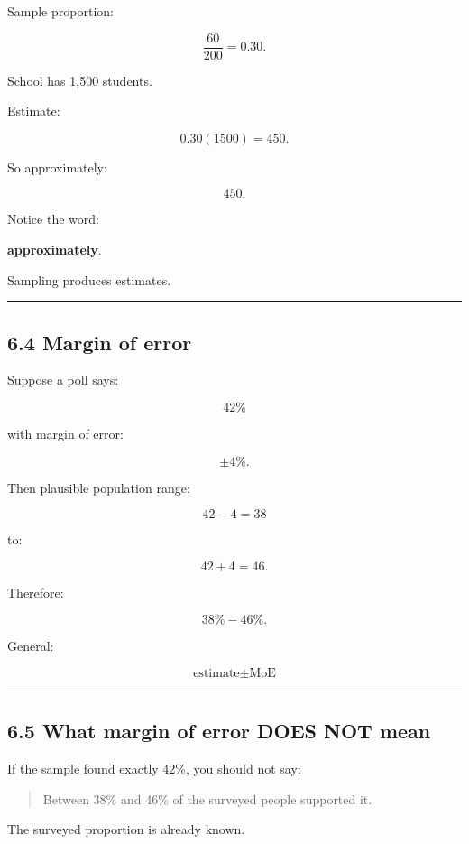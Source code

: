 \documentclass[
]{article}
\begin{document}
Sample proportion:

\[
\frac{60}{200}=0.30.
\]

School has 1,500 students.

Estimate:

\[
0.30(1500)=450.
\]

So approximately:

\[
\boxed{450}.
\]

Notice the word:

\textbf{approximately}.

Sampling produces estimates.

\begin{center}\rule{0.5\linewidth}{0.5pt}\end{center}

\subsection{6.4 Margin of error}\label{margin-of-error}

Suppose a poll says:

\[
42\%
\]

with margin of error:

\[
\pm4\%.
\]

Then plausible population range:

\[
42-4=38
\]

to:

\[
42+4=46.
\]

Therefore:

\[
\boxed{38\%-46\%}.
\]

General:

\[
\boxed{
\text{estimate}\pm\text{MoE}
}
\]

\begin{center}\rule{0.5\linewidth}{0.5pt}\end{center}

\subsection{6.5 What margin of error DOES NOT
mean}\label{what-margin-of-error-does-not-mean}

If the sample found exactly 42\%, you should not say:

\begin{quote}
Between 38\% and 46\% of the surveyed people supported it.
\end{quote}

The surveyed proportion is already known.
\end{document}
